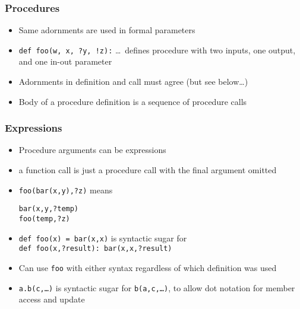 \documentclass[12pt]{beamer}
\begin{document}
\begin{frame}
\frametitle{Procedures}
\begin{itemize}
\item Same adornments are used in formal parameters
\item \texttt{def foo(w, x, ?y, !z):} \ldots\ defines procedure with two
  inputs, one output, and one in-out parameter
\item Adornments in definition and call must agree (but see below\ldots)
\item Body of a procedure definition is a sequence of
  procedure calls
\end{itemize}
\end{frame}


\begin{frame}
\frametitle{Expressions}
\begin{itemize}
\item Procedure arguments can be expressions
\item a function call is just a procedure call with the final argument omitted
\item \texttt{foo(bar(x,y),?z)} \quad means \quad
  \begin{minipage}[c]{0.4\linewidth}
  \texttt{bar(x,y,?temp)} \\
  \texttt{foo(temp,?z)}
  \end{minipage}
\item \texttt{def foo(x) = bar(x,x)} is syntactic sugar for \\
\texttt{def foo(x,?result): bar(x,x,?result)}
\item Can use \texttt{foo} with either syntax regardless of which
  definition was used
\item \texttt{a.b(c,\ldots)} is syntactic sugar for
  \texttt{b(a,c,\ldots)}, to allow dot notation for member access and update
\end{itemize}
\end{frame}
\end{document}
